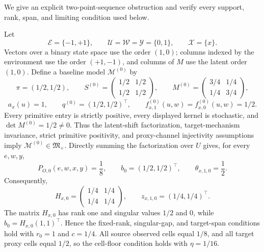 We give an explicit two-point-sequence obstruction and verify every support, rank, span, and limiting condition used below.

Let
\[
\mathcal E=\{-1,+1\},\qquad
\mathcal U=\mathcal W=\mathcal Y=\{0,1\},\qquad
\mathcal X=\{x\}.
\]
Vectors over a binary state space use the order \((1,0)\); columns indexed by the environment use the order \((+1,-1)\), and columns of \(M\) use the latent order \((1,0)\). Define a baseline model \(\mathcal M^{(0)}\) by
\[
\pi=(1/2,1/2),\qquad
S^{(0)}=
\begin{pmatrix}1/2&1/2\\1/2&1/2\end{pmatrix},\qquad
M^{(0)}=
\begin{pmatrix}3/4&1/4\\1/4&3/4\end{pmatrix},
\]
\[
a_x(u)=1,\qquad q^{(0)}=(1/2,1/2)^{\top},\qquad
f^{(0)}_{x,1}(u,w)=f^{(0)}_{x,0}(u,w)=1/2.
\]
Every primitive entry is strictly positive, every displayed kernel is stochastic, and \(\det M^{(0)}=1/2\ne0\). Thus the latent-shift factorization, target-mechanism invariance, strict primitive positivity, and proxy-channel injectivity assumptions imply \(\mathcal M^{(0)}\in\mathfrak M_{+}\). Directly summing the factorization over \(U\) gives, for every \(e,w,y\),
\[
P_{O,0}(e,w,x,y)=\frac18,\qquad
b_0=(1/2,1/2)^{\top},\qquad
\theta_{x,1,0}=\frac12.
\]
Consequently,
\[
H_{x,0}=
\begin{pmatrix}1/4&1/4\\1/4&1/4\end{pmatrix},\qquad
z_{x,1,0}=(1/4,1/4)^{\top}.
\]
The matrix \(H_{x,0}\) has rank one and singular values \(1/2\) and \(0\), while \(b_0=H_{x,0}(1,1)^{\top}\). Hence the fixed-rank, singular-gap, and target-span conditions hold with \(r_0=1\) and \(c=1/4\). All source observed cells equal \(1/8\), and all target proxy cells equal \(1/2\), so the cell-floor condition holds with \(\eta=1/16\).

